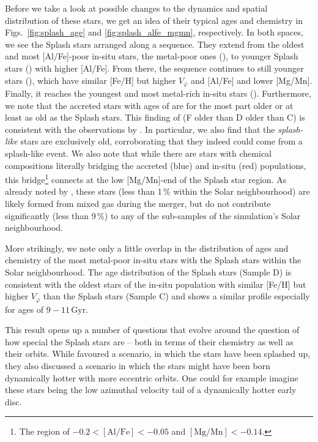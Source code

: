 \documentclass[fleqn,usenatbib]{mnras}
\begin{document}
Before we take a look at possible changes to the dynamics and spatial distribution of these stars, we get an idea of their typical ages and chemistry in Figs.~\ref{fig:splash_age} and \ref{fig:splash_alfe_mgmn}, respectively. In both spaces, we see the Splash stars arranged along a sequence. They extend from the oldest and most [Al/Fe]-poor in-situ stars, the metal-poor ones (), to younger Splash stars () with higher [Al/Fe]. From there, the sequence continues to still younger stars (), which have similar [Fe/H] but higher $V_\varphi$ and [Al/Fe] and lower [Mg/Mn]. Finally, it reaches the youngest and most metal-rich in-situ stars (). Furthermore, we note that the accreted stars with ages of  are for the most part older or at least as old as the Splash stars. This finding of (F older than D older than C) is consistent with the observations by \citet{Belokurov2020}. In particular, we also find that the \textit{splash-like} stars are exclusively old, corroborating that they indeed could come from a splash-like event. We also note that while there are stars with chemical compositions literally bridging the accreted (blue) and in-situ (red) populations, this bridge\footnote{The region of $-0.2 < \mathrm{[Al/Fe]} < -0.05$ and $\mathrm{[Mg/Mn]} < -0.14$.} connects at the low [Mg/Mn]-end of the Splash star region. As already noted by \citet{Buder2024}, these stars  (less than 1\,\% within the Solar neighbourhood) are likely formed from mixed gas during the merger, but do not contribute significantly (less than 9\,\%) to any of the sub-samples of the simulation's Solar neighbourhood.

More strikingly, we note only a little overlap in the distribution of ages and chemistry of the most metal-poor in-situ stars with the Splash stars within the Solar neighbourhood. The age distribution of the Splash stars (Sample D) is consistent with the oldest stars of the in-situ population with similar [Fe/H] but higher $V_\varphi$ than the Splash stars (Sample C) and shows a similar profile especially for ages of $9-11\,\mathrm{Gyr}$.

This result opens up a number of questions that evolve around the question of how special the Splash stars are -- both in terms of their chemistry as well as their orbits. While \citet{Belokurov2020} favoured a scenario, in which the stars have been splashed up, they also discussed a scenario in which the stars might have been born dynamically hotter with more eccentric orbits. One could for example imagine these stars being the low azimuthal velocity tail of a dynamically hotter early disc.
\end{document}
